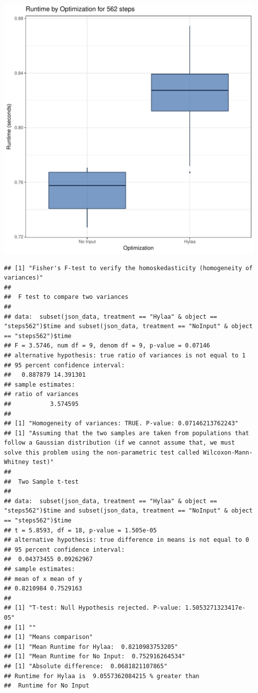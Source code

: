 \documentclass{article}\usepackage[]{graphicx}\usepackage[]{color}
\makeatletter
\def\maxwidth{ %
  \ifdim\Gin@nat@width>\linewidth
    \linewidth
  \else
    \Gin@nat@width
  \fi
}
\newenvironment{kframe}{%
 \def\at@end@of@kframe{}%
 \ifinner\ifhmode%
  \def\at@end@of@kframe{\end{minipage}}%
  \begin{minipage}{\columnwidth}%
 \fi\fi%
 \def\FrameCommand##1{\hskip\@totalleftmargin \hskip-\fboxsep
 \colorbox{shadecolor}{##1}\hskip-\fboxsep
     \hskip-\linewidth \hskip-\@totalleftmargin \hskip\columnwidth}%
 \MakeFramed {\advance\hsize-\width
   \@totalleftmargin\z@ \linewidth\hsize
   \@setminipage}}%
 {\par\unskip\endMakeFramed%
 \at@end@of@kframe}
\newenvironment{knitrout}{}{} %
\makeatother
\begin{document}
\begin{knitrout}
\color{fgcolor}
\includegraphics[width=\maxwidth]{figure/RH4_steps562-1} 
\begin{kframe}\begin{verbatim}
## [1] "Fisher's F-test to verify the homoskedasticity (homogeneity of variances)"
## 
## 	F test to compare two variances
## 
## data:  subset(json_data, treatment == "Hylaa" & object == "steps562")$time and subset(json_data, treatment == "NoInput" & object == "steps562")$time
## F = 3.5746, num df = 9, denom df = 9, p-value = 0.07146
## alternative hypothesis: true ratio of variances is not equal to 1
## 95 percent confidence interval:
##   0.887879 14.391301
## sample estimates:
## ratio of variances 
##           3.574595 
## 
## [1] "Homogeneity of variances: TRUE. P-value: 0.07146213762243"
## [1] "Assuming that the two samples are taken from populations that follow a Gaussian distribution (if we cannot assume that, we must solve this problem using the non-parametric test called Wilcoxon-Mann-Whitney test)"
## 
## 	Two Sample t-test
## 
## data:  subset(json_data, treatment == "Hylaa" & object == "steps562")$time and subset(json_data, treatment == "NoInput" & object == "steps562")$time
## t = 5.8593, df = 18, p-value = 1.505e-05
## alternative hypothesis: true difference in means is not equal to 0
## 95 percent confidence interval:
##  0.04373455 0.09262967
## sample estimates:
## mean of x mean of y 
## 0.8210984 0.7529163 
## 
## [1] "T-test: Null Hypothesis rejected. P-value: 1.5053271323417e-05"
## [1] ""
## [1] "Means comparison"
## [1] "Mean Runtime for Hylaa:  0.8210983753205"
## [1] "Mean Runtime for No Input:  0.752916264534"
## [1] "Absolute difference:  0.0681821107865"
## Runtime for Hylaa is  9.0557362084215 % greater than 
##  Runtime for No Input
\end{verbatim}
\end{kframe}
\end{knitrout}
\end{document}
